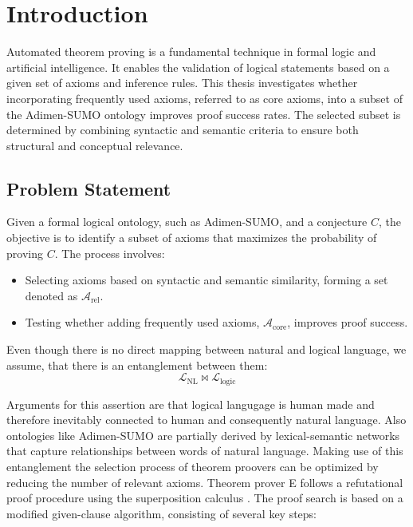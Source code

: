 \documentclass[english,version-2020-11]{uzl-thesis}
\begin{document}
%
%

\chapter{Introduction}
\label{chapter-introduction}

Automated theorem proving is a fundamental technique in formal logic and artificial intelligence. 
It enables the validation of logical statements based on a given set of axioms and inference rules. 
This thesis investigates whether incorporating frequently used axioms, referred to as core axioms, into a subset of the Adimen-SUMO ontology improves proof success rates. 
The selected subset is determined by combining syntactic and semantic criteria to ensure both structural and conceptual relevance.

\section{Problem Statement}
Given a formal logical ontology, such as Adimen-SUMO, and a conjecture \( C \), the objective is to identify a subset of axioms that maximizes the probability of proving \( C \). The process involves:
\begin{itemize}
    \item Selecting axioms based on syntactic and semantic similarity, forming a set denoted as \( \mathcal{A}_{\text{rel}} \).
    \item Testing whether adding frequently used axioms, \( \mathcal{A}_{\text{core}} \), improves proof success.
\end{itemize}

Even though there is no direct mapping between natural and logical language, we assume, that there is an entanglement between them: \\
\begin{equation}
    \mathcal{L}_{\text{NL}} \bowtie \mathcal{L}_{\text{logic}}
\end{equation}

Arguments for this assertion are that logical langugage is human made and therefore inevitably connected to human and consequently natural language.
Also ontologies like Adimen-SUMO are partially derived by lexical-semantic networks that capture relationships between words of natural language.
Making use of this entanglement the selection process of theorem proovers can be optimized by reducing the number of relevant axioms.
Theorem prover E follows a refutational proof procedure using the superposition calculus \cite{Schulz2019}. The proof search is based on a modified given-clause algorithm, consisting of several key steps:
\end{document}
